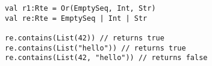 \begin{lstlisting}[style=scalaioScala]
val r1:Rte = Or(EmptySeq, Int, Str)
val re:Rte = EmptySeq | Int | Str
      
re.contains(List(42)) // returns true
re.contains(List("hello")) // returns true
re.contains(List(42, "hello")) // returns false
\end{lstlisting}
